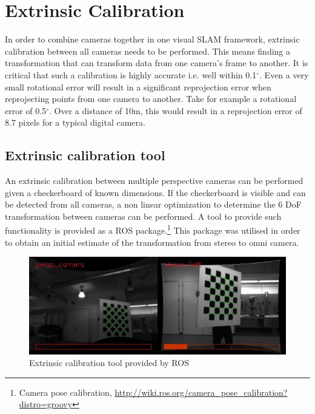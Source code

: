\chapter{Extrinsic Calibration}
\label{chapter:extrinsic_calibration}

In order to combine cameras together in one visual SLAM framework, extrinsic calibration between all cameras needs to be performed.  This means finding a transformation that can transform data from one camera's frame to another.  It is critical that such a calibration is highly accurate i.e. well within 0.1$^{\circ}$.  Even a very small rotational error will result in a significant reprojection error when reprojecting points from one camera to another.  Take for example a rotational error of 0.5$^{\circ}$.  Over a distance of 10m, this would result in a reprojection error of 8.7 pixels for a typical digital camera.

\section{Extrinsic calibration tool}
\label{sec:ros_tool}

An extrinsic calibration between multiple perspective cameras can be performed given a checkerboard of known dimensions.  If the checkerboard is visible and can be detected from all cameras, a non linear optimization to determine the 6 DoF transformation between cameras can be performed.  A tool to provide such functionality is provided as a ROS package.\footnote{Camera pose calibration, \url{http://wiki.ros.org/camera_pose_calibration?distro=groovy}}  This package was utilised in order to obtain an initial estimate of the transformation from stereo to omni camera.

\begin{figure}[h!]
  \centering
    \includegraphics[width=1.0\textwidth]{chapters/images/extrinsic_cal_1}
  \caption{Extrinsic calibration tool provided by ROS}
  \label{fig:extrinsic_cal_1}
\end{figure}

